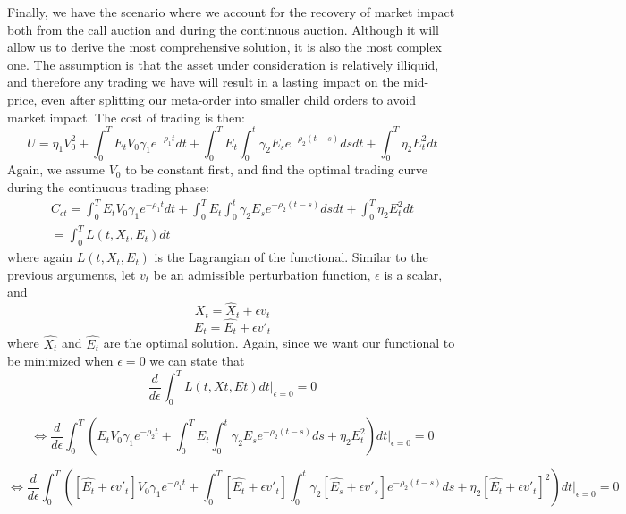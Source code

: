 \documentclass{article}
\begin{document}
Finally, we have the scenario where we account for the recovery of market impact both from the call auction and during the continuous auction. Although it will allow us to derive the most comprehensive solution, it is also the most complex one. The assumption is that the asset under consideration is relatively illiquid, and therefore any trading we have will result in a lasting impact on the mid-price, even after splitting our meta-order into smaller child orders to avoid market impact. The cost of trading is then:
\[
  U = \eta_1 V_0^2  + \int_0^T E_t V_0 \gamma_1 e^{-\rho_1 t} dt + \int_0^T E_t \int_0^t  \gamma_2 E_s e^{-\rho_2(t-s)} ds dt  + \int_0^T \eta_2 E_t^2 dt
\]
Again, we assume $V_0$ to be constant first, and find the optimal trading curve during the continuous trading phase:
\[
  \begin{aligned}
    C_{ct} = \int_0^T E_t V_0 \gamma_1 e^{-\rho_1 t} dt + \int_0^T E_t \int_0^t  \gamma_2 E_s e^{-\rho_2(t-s)} ds dt  + \int_0^T \eta_2 E_t^2 dt \\
    = \int_0^T L(t, X_t,E_t) dt
  \end{aligned}
\]
where again $L(t, X_t,E_t)$ is the Lagrangian of the functional. Similar to the previous arguments, let $v_t$ be an admissible perturbation function, $\epsilon$ is a scalar, and
\[
  X_t = \hat{X}_t + \epsilon v_t
\]
\[
  E_t = \hat{E_t} + \epsilon {v'}_t
\]
where $\hat{X_t}$ and $\hat{E_t}$ are the optimal solution. Again, since we want our functional to be minimized when $\epsilon=0$ we can state that
\[
  \frac{d}{d\epsilon} \int_0^T L(t, Xt, Et) dt|_{\epsilon=0}=0
\]

\[
  \Leftrightarrow \frac{d}{d\epsilon} \int_0^T (E_t V_0 \gamma_1 e^{-\rho_2 t} + \int_0^T E_t \int_0^t  \gamma_2 E_s e^{-\rho_2(t-s)} ds + \eta_2 E_t^2) dt|_{\epsilon=0}=0
\]

\[
  \Leftrightarrow \frac{d}{d\epsilon} \int_0^T ( [\hat{E_t} + \epsilon {v'}_t] V_0 \gamma_1 e^{-\rho_1 t} + \int_0^T [\hat{E_t} + \epsilon {v'}_t] \int_0^t  \gamma_2 [\hat{E_s} + \epsilon {v'}_s] e^{-\rho_2(t-s)} ds + \eta_2 [\hat{E_t} + \epsilon {v'}_t]^2) dt|_{\epsilon=0}=0
\]
\end{document}
